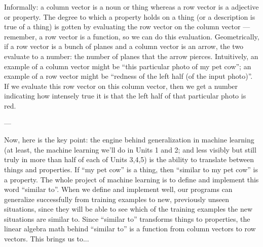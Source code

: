 \documentclass[11pt, justified]{tufte-book}
\newcommand{\sampassage}[1]{
   \vspace{0.1cm}
   \par\noindent{\hspace{-2cm}\normalsize \sc \gre #1} ---
}
\theoremstyle{definition}
\begin{document}
        Informally: a column vector is a noun or thing whereas a row vector is
        a adjective or property.  The degree to which a property holds on a
        thing (or a description is true of a thing) is gotten by evaluating the
        row vector on the column vector --- remember, a row vector is a
        function, so we can do this evaluation.  Geometrically, if a row vector
        is a bunch of planes and a column vector is an arrow, the two evaluate
        to a number: the number of planes that the arrow pierces.  Intuitively,
        an example of a column vector might be ``this particular photo of my
        pet cow''; an example of a row vector might be ``redness of the left
        half (of the input photo)''.  If we evaluate this row vector on this
        column vector, then we get a number indicating how intensely true it is
        that the left half of that particular photo is red.
        
      \sampassage{inner products}
        Now, here is the key point: the engine behind generalization in machine
        learning (at least, the machine learning we'll do in Units 1 and 2; and
        less visibly but still truly in more than half of each of Units 3,4,5)
        is the ability to translate between things and properties.  If ``my pet
        cow'' is a thing, then ``similar to my pet cow'' is a property.  The whole
        project of machine learning is to define and implement this word
        ``similar to''.  When we define and implement well, our programs can
        generalize successfully from training examples to new, previously
        unseen situations, since they will be able to see which of the training
        examples the new situations are similar to.  Since ``similar to''
        transforms things to properties, the linear algebra math behind
        ``similar to'' is a function from column vectors to row vectors.  This
        brings us to...
\end{document}

